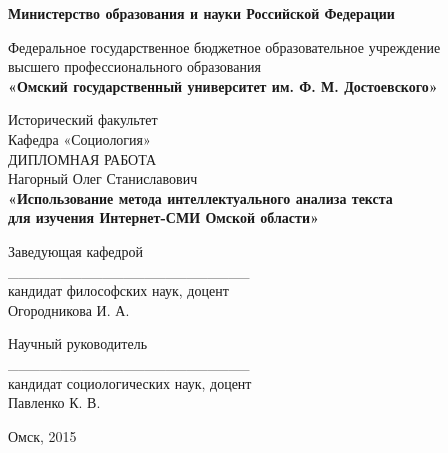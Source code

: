 \begin{titlepage}

\begin{center}
{\bf Министерство образования и науки Российской Федерации} \par

\vspace{5mm}

Федеральное государственное бюджетное образовательное учреждение \\
высшего профессионального образования \\
{\bf «Омский государственный университет им. Ф. М. Достоевского»} 

\vspace{0.5cm}
Исторический факультет\\
Кафедра «Социология»\\
\vspace{2cm}
{\Large ДИПЛОМНАЯ РАБОТА}\\
\vspace{2cm}
{\large Нагорный Олег Станиславович}\\
\vspace{1cm}
\textbf{\large «Использование метода интеллектуального анализа текста\\ для изучения Интернет-СМИ Омской области»\\}

\vspace{4cm}

\setlength{\columnsep}{3cm}
\begin{multicols}{2}

		\begin{flushleft}
			Заведующая кафедрой\\
			\vspace{1cm}
			\_\_\_\_\_\_\_\_\_\_\_\_\_\_\_\_\_\_\_\_\_\_\_ \\
			кандидат философских наук, доцент\\
			Огородникова И. А.\\
		\end{flushleft}
		
	\columnbreak
	
		\begin{flushleft}
			Научный руководитель\\
			\vspace{1cm}
			\_\_\_\_\_\_\_\_\_\_\_\_\_\_\_\_\_\_\_\_\_\_\_ \\
			кандидат социологических наук, доцент\\
			Павленко К. В.\\
		\end{flushleft}
\end{multicols}

\vspace{4cm}

Омск, 2015
\end{center}

\end{titlepage}